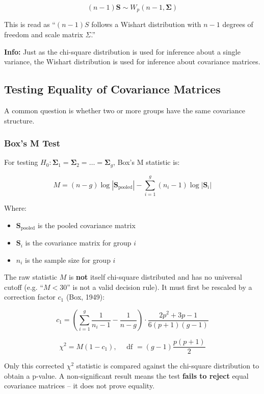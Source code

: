 \documentclass[
]{article}
\begin{document}
\[(n - 1)\mathbf{S} \sim W_{p}\left( n - 1,\mathbf{\Sigma} \right)\]

This is read as ``\((n - 1)S\) follows a Wishart distribution with
\(n - 1\) degrees of freedom and scale matrix \(\Sigma\).''

\textbf{Info: } Just as the chi-square distribution is used for
inference about a single variance, the Wishart distribution is used for
inference about covariance matrices.

\textbf{ }

\subsection{Testing Equality of Covariance Matrices}

A common question is whether two or more groups have the same covariance
structure.

\subsubsection{Box's M Test}

For testing
\(H_{0}:\mathbf{\Sigma}_{1} = \mathbf{\Sigma}_{2} = \ldots = \mathbf{\Sigma}_{g}\),
Box's M statistic is:

\[M = (n - g)\log|\mathbf{S}_{\text{pooled}}| - \sum_{i = 1}^{g}\left( n_{i} - 1 \right)\log|\mathbf{S}_{i}|\]

Where:

\begin{itemize}
\item
  \(\mathbf{S}_{\text{pooled}}\) is the pooled covariance matrix
\item
  \(\mathbf{S}_{i}\) is the covariance matrix for group \(i\)
\item
  \(n_{i}\) is the sample size for group \(i\)
\end{itemize}

The raw statistic \(M\) is \textbf{not} itself chi-square distributed
and has no universal cutoff (e.g. ``\(M < 30\)'' is not a valid decision
rule). It must first be rescaled by a correction factor \(c_{1}\) (Box,
1949):

\[c_{1} = \left( \sum_{i = 1}^{g}\frac{1}{n_{i} - 1} - \frac{1}{n - g} \right) \cdot \frac{2p^{2} + 3p - 1}{6(p + 1)(g - 1)}\]

\[\chi^{2} = M\left( 1 - c_{1} \right),\quad\text{ df } = (g - 1)\frac{p(p + 1)}{2}\]

Only this corrected \(\chi^{2}\) statistic is compared against the
chi-square distribution to obtain a p-value. A non-significant result
means the test \textbf{fails to reject} equal covariance matrices -- it
does not prove equality.
\end{document}
